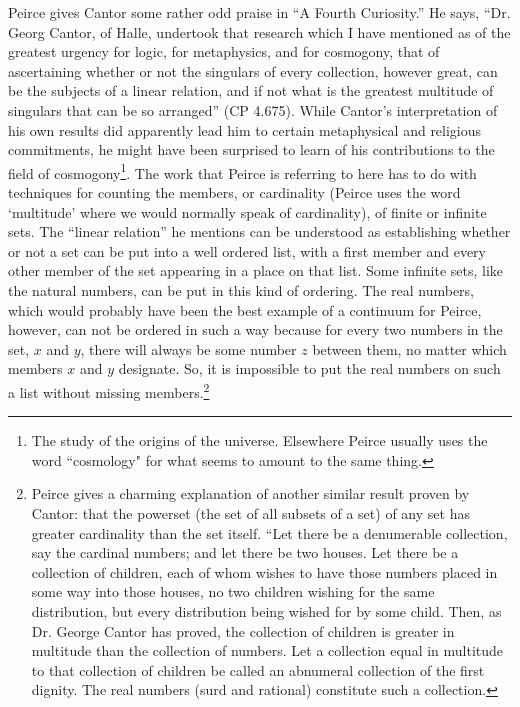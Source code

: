 Peirce gives Cantor some rather odd praise in ``A Fourth Curiosity.'' He says, ``Dr. Georg Cantor, of Halle, undertook that research which I have mentioned as of the greatest urgency for logic, for metaphysics, and for cosmogony, that of ascertaining whether or not the singulars of every collection, however great, can be the subjects of a linear relation, and if not what is the greatest multitude of singulars that can be so arranged'' (CP 4.675). While Cantor's interpretation of his own results did apparently lead him to certain metaphysical and religious commitments, he might have been surprised to learn of his contributions to the field of cosmogony\footnote{The study of the origins of the universe. Elsewhere Peirce usually uses the word ``cosmology" for what seems to amount to the same thing.}. The work that Peirce is referring to here has to do with techniques for counting the members, or cardinality (Peirce uses the word `multitude' where we would normally speak of cardinality), of finite or infinite sets. The ``linear relation'' he mentions can be understood as establishing whether or not a set can be put into a well ordered list, with a first member and every other member of the set appearing in a place on that list. Some infinite sets, like the natural numbers, can be put in this kind of ordering. The real numbers, which would probably have been the best example of a continuum for Peirce, however, can not be ordered in such a way because for every two numbers in the set, $x$ and $y$, there will always be some number $z$ between them, no matter which members $x$ and $y$ designate. So, it is impossible to put the real numbers on such a list without missing members.\footnote{Peirce gives a charming explanation of another similar result proven by Cantor: that the powerset (the set of all subsets of a set) of any set has greater cardinality than the set itself. ``Let there be a denumerable collection, say the cardinal numbers; and let there be two houses. Let there be a collection of children, each of whom wishes to have those numbers placed in some way into those houses, no two children wishing for the same distribution, but every distribution being wished for by some child. Then, as Dr. George Cantor has proved, the collection of children is greater in multitude than the collection of numbers. Let a collection equal in multitude to that collection of children be called an abnumeral collection of the first dignity. The real numbers (surd and rational) constitute such a collection.

}
